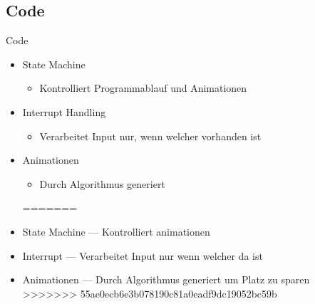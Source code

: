 \documentclass[mathserif,9pt]{article}
\begin{document}
    \subsection{Code}
    \begin{frame}{Code}
        \begin{block}{}
            \begin{itemize}
<<<<<<< HEAD
                \item State Machine
                 \begin{itemize}
                    \item Kontrolliert Programmablauf und Animationen
                \end{itemize}
                \item Interrupt Handling
                \begin{itemize}
                    \item Verarbeitet Input nur, wenn welcher vorhanden ist
                \end{itemize}
                \item Animationen
                \begin{itemize}
                    \item Durch Algorithmus generiert
                \end{itemize}
=======
                \item State Machine --- Kontrolliert animationen
                \item Interrupt --- Verarbeitet Input nur wenn welcher da ist
                \item Animationen --- Durch Algorithmus generiert um Platz zu sparen
>>>>>>> 55ae0ecb6e3b078190c81a0eadf9dc19052bc59b
            \end{itemize}
        \end{block}
    \end{frame}
    
\end{document}
